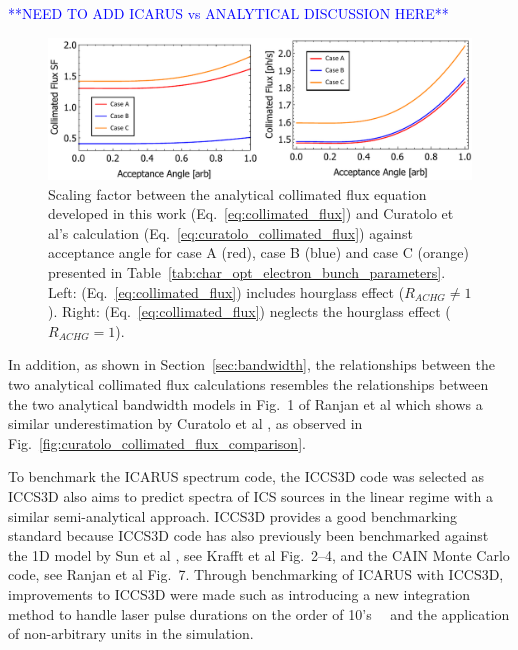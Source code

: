 \documentclass[../main.tex]{subfiles}
\begin{document}
\textcolor{blue}{**NEED TO ADD ICARUS vs ANALYTICAL DISCUSSION HERE**}

\begin{figure}[!h]
\centering
\includegraphics[width=\textwidth]{Figures/Optimisation_and_Characterisation_of_Inverse_Compton_Scattering_Sources/Opt_Char_Fcol_Curatolo_SF_FINAL.pdf}
\caption{Scaling factor between the analytical collimated flux equation developed in this work (Eq.~\ref{eq:collimated_flux}) and Curatolo et al's \cite{curatolo2017analytical} calculation (Eq.~\ref{eq:curatolo_collimated_flux}) against acceptance angle for case A (red), case B (blue) and case C (orange) presented in Table~\ref{tab:char_opt_electron_bunch_parameters}. Left: (Eq.~\ref{eq:collimated_flux}) includes hourglass effect ($R_{ACHG}\neq 1$). Right: (Eq.~\ref{eq:collimated_flux}) neglects the hourglass effect ($R_{ACHG} = 1$).}
\label{fig:curatolo_scaling_factor_comparison}
\end{figure}

In addition, as shown in Section~\ref{sec:bandwidth}, the relationships between the two analytical collimated flux calculations resembles the relationships between the two analytical bandwidth models in Fig.~1 of Ranjan et al \cite{ranjan2018simulation} which shows a similar underestimation by Curatolo et al \cite{curatolo2017analytical}, as observed in Fig.~\ref{fig:curatolo_collimated_flux_comparison}.

To benchmark the \textsc{ICARUS} spectrum code, the \textsc{ICCS3D} code \cite{krafft2016laser,ranjan2018simulation} was selected as \textsc{ICCS3D} also aims to predict spectra of ICS sources in the linear regime with a similar semi-analytical approach. \textsc{ICCS3D} provides a good benchmarking standard because  \textsc{ICCS3D} code has also previously been benchmarked against the 1D model by Sun et al \cite{sun2009energy}, see Krafft et al \cite{krafft2016laser} Fig.~2--4, and the \textsc{CAIN} Monte Carlo code, see Ranjan et al\cite{ranjan2018simulation} Fig.~7. Through benchmarking of \textsc{ICARUS} with \textsc{ICCS3D}, improvements to \textsc{ICCS3D} were made such as introducing a new integration method to handle laser pulse durations on the order of 10's~\si{\pico\seconds} and the application of non-arbitrary units in the simulation.
\end{document}

